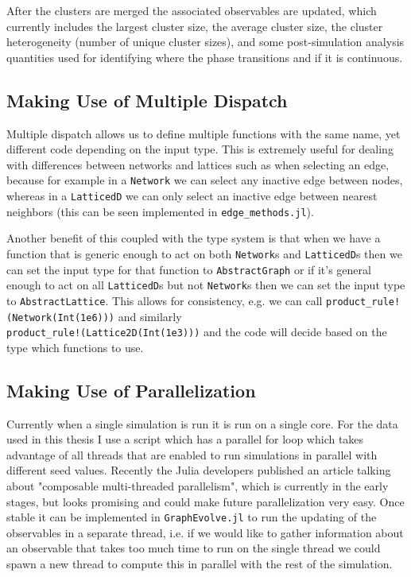 After the clusters are merged the associated observables are updated, which currently includes the largest cluster size, the average cluster size, the cluster heterogeneity (number of unique cluster sizes), and some post-simulation analysis quantities used for identifying where the phase transitions and if it is continuous.



\subsection{Making Use of Multiple Dispatch}
Multiple dispatch allows us to define multiple functions with the same name, yet different code depending on the input type.
This is extremely useful for dealing with differences between networks and lattices such as when selecting an edge, because for example in a \texttt{Network} we can select any inactive edge between nodes, whereas in a \texttt{LatticedD} we can only select an inactive edge between nearest neighbors (this can be seen implemented in \texttt{edge\_methods.jl}).

Another benefit of this coupled with the type system is that when we have a function that is generic enough to act on both \texttt{Network}s and \texttt{LatticedD}s then we can set the input type for that function to \texttt{AbstractGraph} or if it's general enough to act on all \texttt{LatticedD}s but not \texttt{Network}s then we can set the input type to \texttt{AbstractLattice}.
This allows for consistency, e.g. we can call \texttt{product\_rule!(Network(Int(1e6)))} and similarly\\\noindent \texttt{product\_rule!(Lattice2D(Int(1e3)))} and the code will decide based on the type which functions to use.



\subsection{Making Use of Parallelization}
Currently when a single simulation is run it is run on a single core.
For the data used in this thesis I use a script which has a parallel for loop which takes advantage of all threads that are enabled to run simulations in parallel with different seed values.
Recently the Julia developers published an article talking about "composable multi-threaded parallelism", which is currently in the early stages, but looks promising and could make future parallelization very easy.
Once stable it can be implemented in \texttt{GraphEvolve.jl} to run the updating of the observables in a separate thread, i.e. if we would like to gather information about an observable that takes too much time to run on the single thread we could spawn a new thread to compute this in parallel with the rest of the simulation.



